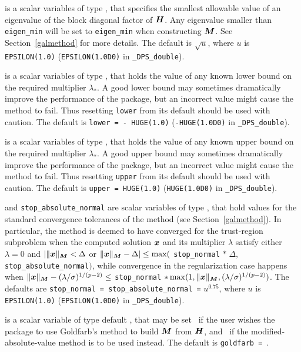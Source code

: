 \documentclass{galahad}
\newcommand{\packagename}{DPS}
\newcommand{\fullpackagename}{\libraryname\_\packagename}
\begin{document}
\begin{description}
 is a scalar variables of type \realdp, that specifies the
smallest allowable value of an eigenvalue of the block diagonal factor of
${\bm{H}}$. Any eigenvalue smaller than {\tt eigen\_min}
will be set to {\tt eigen\_min} when constructing ${\bm{M}}$.
See Section~\ref{galmethod} for more details.
The default is $\sqrt{u}$, where $u$ is
{\tt EPSILON(1.0)} ({\tt EPSILON(1.0D0)} in {\tt \fullpackagename\_double}).

 is a scalar variables of type \realdp, that holds the value
of any known lower bound on the required multiplier $\lambda_*$. A good lower
bound may sometimes dramatically improve the performance of the package, but
an incorrect value might cause the method to fail. Thus resetting
{\tt lower} from its default should be used with caution.
The default is {\tt lower = - HUGE(1.0)}
({\tt -HUGE(1.0D0)} in {\tt \fullpackagename\_double}).

 is a scalar variables of type \realdp, that holds the value
of any known upper bound on the required multiplier $\lambda_*$. A good upper
bound may sometimes dramatically improve the performance of the package, but
an incorrect value might cause the method to fail. Thus resetting
{\tt upper} from its default should be used with caution.
The default is {\tt upper = HUGE(1.0)}
({\tt HUGE(1.0D0)} in {\tt \fullpackagename\_double}).

 and {\tt stop\_absolute\_normal}
are scalar variables of type \realdp,
that hold values for the standard convergence tolerances of the method
(see Section~\ref{galmethod}).
In particular, the method is deemed to have converged for the trust-region
subproblem when the
computed solution ${\bm{x}}$ and its multiplier $\lambda$ satisfy either
$\lambda = 0$ and $|\|{\bm{x}}\|_{{\bm{M}}} < \Delta$ or
$\|{\bm{x}}\|_{{\bm{M}}} -  \Delta| \leq \max($ {\tt stop\_normal} $\ast \; \Delta,$
{\tt stop\_absolute\_normal}$)$,
while convergence in the regularization case happens when
$\|{\bm{x}}\|_{{\bm{M}}} -  (\lambda/\sigma)^{1/(p-2)} \leq$ {\tt stop\_normal}
\linebreak $\ast \max(1,\|{\bm{x}}\|_{{\bm{M}}},(\lambda/\sigma)^{1/(p-2)})$.
The defaults are {\tt stop\_normal = \tt stop\_absolute\_normal =}
$u^{0.75}$,
where $u$ is {\tt EPSILON(1.0)} ({\tt EPSILON(1.0D0)} in
{\tt \fullpackagename\_double}).

 is a scalar variable of type default \logical, that
may be set \true\ if the user wishes the package to use Goldfarb's
method to build ${\bm{M}}$ from ${\bm{H}}$, and \false\ if the modified-absolute-value
method is to be used instead.
The default is {\tt goldfarb = \false}.


\end{description}
\end{document}

